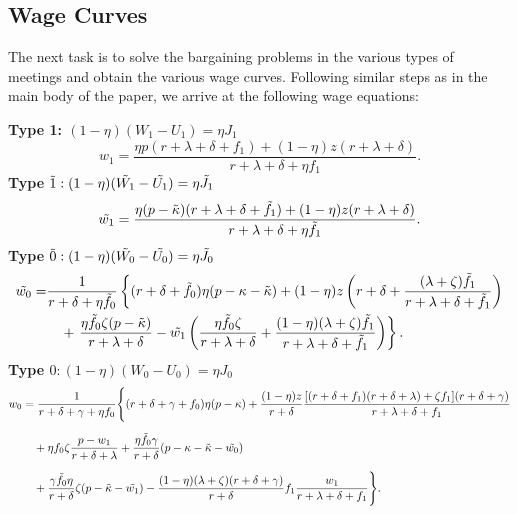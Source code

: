 \documentclass[12pt]{article} %
\theoremstyle{definition}
\begin{document}
\subsection*{Wage Curves}

The next task is to solve the bargaining problems in the various types of meetings and obtain the various wage curves. Following similar steps as in the main body of the paper, we arrive at the following wage equations: 

\medskip 

\noindent \textbf{Type 1: $(1-\eta)(W_1-U_1) = \eta J_1$}
\begin{equation}
 w_1 = \frac{\eta p (r+\lambda+\delta+f_1)+(1-\eta)z(r+\lambda+\delta)}{r+\lambda+\delta + \eta f_1}. \label{eq WC 1 early}
 \end{equation}
 \textbf{Type $\Tilde{1}: (1-\eta)(\Tilde{W_1}-\Tilde{U_1}) = \eta \Tilde{J_1}$}
\begin{equation}
\Tilde{w_1} = \frac{\eta (p-\Tilde{\kappa}) (r+\lambda+\delta+\Tilde{f_1})+(1-\eta)z(r+\lambda+\delta)}{r+\lambda+\delta + \eta \Tilde{f_1}}. \label{eq WC1 tilde early}
\end{equation}
\textbf{Type $\Tilde{0}: (1-\eta)(\Tilde{W_0}-\Tilde{U_0}) = \eta \Tilde{J_0}$}
\begin{equation}
\begin{aligned}
    \Tilde{w_0} = 
    & \frac{1}{r+\delta+\eta \Tilde{f_0}}\left\{ 
        (r+\delta+\Tilde{f_0})\eta(p-\kappa-\Tilde{\kappa}) + (1-\eta)z \left(r+\delta+\frac{(\lambda+\zeta)\Tilde{f_1}}{r+\lambda+\delta+\Tilde{f_1}}\right) \right. \\
    & \quad + \left. \frac{\eta \Tilde{f_0} \zeta (p-\Tilde{\kappa})}{r+\lambda+\delta} - \Tilde{w_1}\left(\frac{\eta \Tilde{f_0} \zeta}{r+\lambda+\delta} + \frac{(1-\eta)(\lambda+\zeta)\Tilde{f_1}}{r+\lambda+\delta+\Tilde{f_1}}\right)
      \right\}.\label{eq WC0 tilde early}
\end{aligned}
\end{equation}
\textbf{Type $0: (1-\eta)(W_0-U_0) = \eta J_0$}
\begin{align}
w_0
&=  \frac{1}{r+\delta+\gamma+\eta f_0} \Biggl\{ 
    (r+\delta+\gamma+f_0)\eta(p-\kappa) + \frac{(1-\eta)z}{r+\delta} \frac{[(r+\delta+f_1)(r+\delta+\lambda)+\zeta f_1](r+\delta + \gamma)}{r+\lambda+\delta+f_1}
\nonumber \\[6pt]
&\quad + \eta f_0 \zeta \frac{p-w_1}{r+\delta+\lambda} + \frac{\eta \Tilde{f_0} \gamma}{r+\delta} (p-\kappa-\Tilde{\kappa}-\Tilde{w_0}) 
\label{eq WC0 early} \\[6pt]
&\quad + \frac{\gamma \Tilde{f_0} \eta}{r+\delta} \zeta (p-\Tilde{\kappa} - \Tilde{w_1}) - \frac{(1-\eta)(\lambda+\zeta)(r+\delta+\gamma)}{r+\delta} f_1 \frac{w_1}{r+\lambda+\delta+f_1}
      \Biggr\}.
      \nonumber
\end{align}
\end{document}
